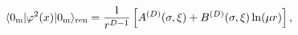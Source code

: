 \begin{equation}\label{renphi2form}
\langle 0_{{\rm m}}|\varphi ^2(x)|0_{{\rm m}}\rangle _{{\rm
ren}}=\frac{1}{r^{D-1}}\left[ A^{(D)}(\sigma , \xi
)+B^{(D)}(\sigma ,\xi )\ln (\mu r)\right] ,
\end{equation}

